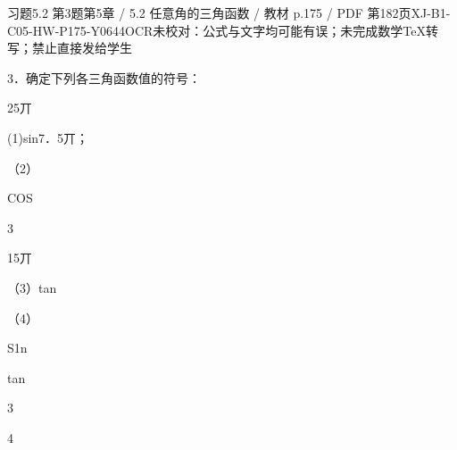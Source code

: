 \begin{bankitem}{习题5.2 第3题}{第5章 / 5.2 任意角的三角函数 / 教材 p.175 / PDF 第182页}{XJ-B1-C05-HW-P175-Y0644}{OCR未校对：公式与文字均可能有误；未完成数学TeX转写；禁止直接发给学生}
\begin{ocrdraft}
\par
3．确定下列各三角函数值的符号：
\par
25丌
\par
(1)sin7．5丌；
\par
（2）
\par
COS
\par
3
\par
15丌
\par
（3）tan
\par
（4）
\par
S1n
\par
tan
\par
3
\par
4
\end{ocrdraft}
\end{bankitem}
